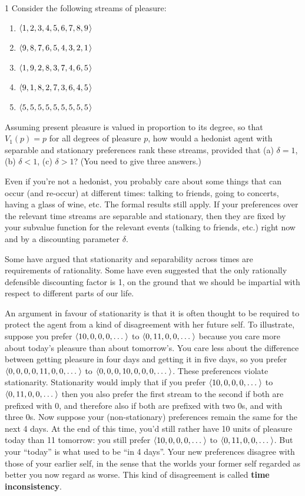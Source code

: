 \begin{exercise}{1}
  Consider the following streams of pleasure:
  \begin{enumerate}
    \itemsep-0.3em 
  \item[S1:] $\t{1,2,3,4,5,6,7,8,9}$ 
  \item[S2:] $\t{9,8,7,6,5,4,3,2,1}$
  \item[S3:] $\t{1,9,2,8,3,7,4,6,5}$ 
  \item[S4:] $\t{9,1,8,2,7,3,6,4,5}$ 
  \item[S5:] $\t{5,5,5,5,5,5,5,5,5}$
  \end{enumerate}
  Assuming present pleasure is valued in proportion to its degree, so
  that $V_1(p) = p$ for all degrees of pleasure $p$, how would a
  hedonist agent with separable and stationary preferences rank these
  streams, provided that (a) $\delta = 1$, (b)
  $\delta < 1$, (c) $\delta > 1$? (You need to give three answers.)
\end{exercise}

Even if you're not a hedonist, you probably care about some things that can
occur (and re-occur) at different times: talking to friends, going to concerts,
having a glass of wine, etc. The formal results still apply. If your preferences
over the relevant time streams are separable and stationary, then they are fixed
by your subvalue function for the relevant events (talking to friends, etc.)
right now and by a discounting parameter $\delta$.

Some have argued that stationarity and separability across times are
requirements of rationality. Some have even suggested that the only rationally
defensible discounting factor is 1, on the ground that we should be impartial
with respect to different parts of our life.

An argument in favour of stationarity is that it is often thought to be required
to protect the agent from a kind of disagreement with her future self. To
illustrate, suppose you prefer $\t{10, 0, 0, 0, \ldots}$ to
$\t{0, 11, 0, 0, \ldots}$ because you care more about today's pleasure than
about tomorrow's. You care less about the difference between getting pleasure in
four days and getting it in five days, so you prefer
$\t{0, 0, 0, 0, 11, 0, 0, \ldots}$ to $\t{0, 0, 0, 10, 0, 0, 0, \ldots}$. These
preferences violate stationarity. Stationarity would imply that if you prefer
$\t{10, 0, 0, 0, \ldots}$ to $\t{0, 11, 0, 0, \ldots}$ then you also prefer the
first stream to the second if both are prefixed with 0, and therefore also if
both are prefixed with two 0s, and with three 0s. Now suppose your
(non-stationary) preferences remain the same for the next 4 days. At the end of
this time, you'd still rather have 10 units of pleasure today than 11 tomorrow:
you still prefer $\t{10, 0, 0, 0, \ldots}$ to $\t{0, 11, 0, 0, \ldots}$. But
your ``today'' is what used to be ``in 4 days''. Your new preferences disagree
with those of your earlier self, in the sense that the worlds your former self
regarded as better you now regard as worse. This kind of disagreement is called
\textbf{time inconsistency}.

